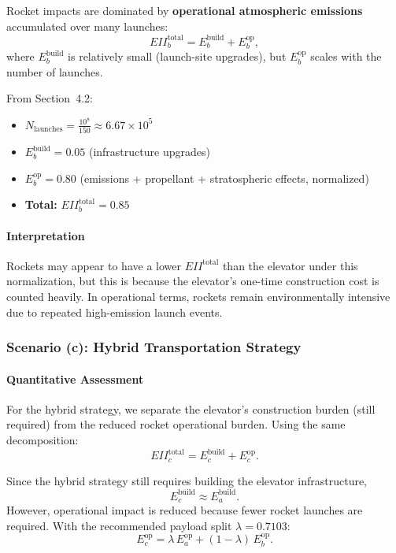 \documentclass{mcmthesis}
\begin{document}
Rocket impacts are dominated by \textbf{operational atmospheric emissions} accumulated over many launches:
\begin{equation}
    EII_b^{\text{total}} = E_b^{\text{build}} + E_b^{\text{op}},
\end{equation}
where $E_b^{\text{build}}$ is relatively small (launch-site upgrades), but $E_b^{\text{op}}$ scales with the number of launches.

From Section~4.2:
\begin{itemize}
    \item $N_{\text{launches}} = \frac{10^8}{150} \approx 6.67\times 10^5$
    \item $E_b^{\text{build}} = 0.05$ \quad (infrastructure upgrades)
    \item $E_b^{\text{op}} = 0.80$ \quad (emissions + propellant + stratospheric effects, normalized)
    \item \textbf{Total:} $EII_b^{\text{total}} = 0.85$
\end{itemize}

\paragraph{Interpretation}
Rockets may appear to have a lower $EII^{\text{total}}$ than the elevator under this normalization, but this is because the elevator's one-time construction cost is counted heavily. In operational terms, rockets remain environmentally intensive due to repeated high-emission launch events.

\subsubsection{Scenario (c): Hybrid Transportation Strategy}

\paragraph{Quantitative Assessment}

For the hybrid strategy, we separate the elevator's construction burden (still required) from the reduced rocket operational burden. Using the same decomposition:
\begin{equation}
    EII_c^{\text{total}} = E_c^{\text{build}} + E_c^{\text{op}}.
\end{equation}

Since the hybrid strategy still requires building the elevator infrastructure,
\[
    E_c^{\text{build}} \approx E_a^{\text{build}}.
\]
However, operational impact is reduced because fewer rocket launches are required. With the recommended payload split $\lambda=0.7103$:
\begin{equation}
    E_c^{\text{op}} = \lambda\,E_a^{\text{op}} + (1-\lambda)\,E_b^{\text{op}}.
\end{equation}
\end{document}
